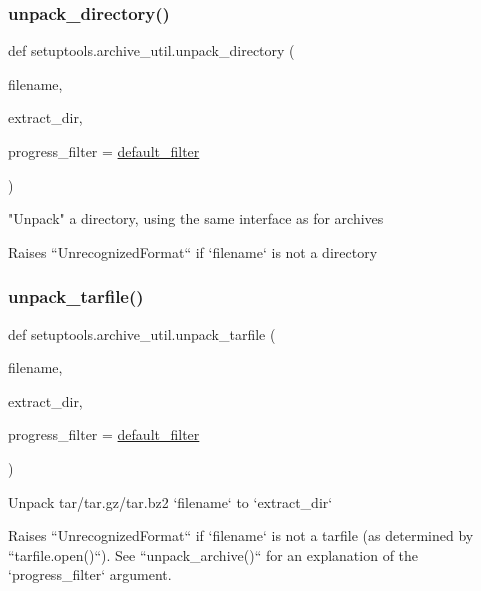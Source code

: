 \subsubsection{\texorpdfstring{unpack\+\_\+directory()}{unpack\_directory()}}
{\footnotesize\ttfamily def setuptools.\+archive\+\_\+util.\+unpack\+\_\+directory (\begin{DoxyParamCaption}\item[{}]{filename,  }\item[{}]{extract\+\_\+dir,  }\item[{}]{progress\+\_\+filter = {\ttfamily \hyperlink{namespacesetuptools_1_1archive__util_adede8e93e57be04915ea0d27831b654b}{default\+\_\+filter}} }\end{DoxyParamCaption})}

\begin{DoxyVerb}"Unpack" a directory, using the same interface as for archives

Raises ``UnrecognizedFormat`` if `filename` is not a directory
\end{DoxyVerb}
 \mbox{\label{namespacesetuptools_1_1archive__util_aee037d06b845eaf69e229fafccae35b9}} 
\subsubsection{\texorpdfstring{unpack\+\_\+tarfile()}{unpack\_tarfile()}}
{\footnotesize\ttfamily def setuptools.\+archive\+\_\+util.\+unpack\+\_\+tarfile (\begin{DoxyParamCaption}\item[{}]{filename,  }\item[{}]{extract\+\_\+dir,  }\item[{}]{progress\+\_\+filter = {\ttfamily \hyperlink{namespacesetuptools_1_1archive__util_adede8e93e57be04915ea0d27831b654b}{default\+\_\+filter}} }\end{DoxyParamCaption})}

\begin{DoxyVerb}Unpack tar/tar.gz/tar.bz2 `filename` to `extract_dir`

Raises ``UnrecognizedFormat`` if `filename` is not a tarfile (as determined
by ``tarfile.open()``).  See ``unpack_archive()`` for an explanation
of the `progress_filter` argument.
\end{DoxyVerb}
 \mbox{\label{namespacesetuptools_1_1archive__util_a01c6de8920234e1bcb47befda68d40c4}} 
